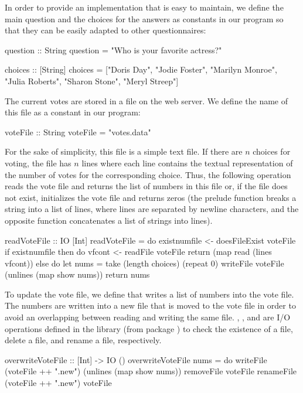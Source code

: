 In order to provide an implementation that is easy to maintain,
we define the main question and the choices for the answers
as constants in our program so that they can be easily adapted
to other questionnaires:
\begin{curry}
question :: String
question = "Who is your favorite actress?"

choices :: [String]
choices = ["Doris Day", "Jodie Foster", "Marilyn Monroe",
           "Julia Roberts", "Sharon Stone", "Meryl Streep"]
\end{curry}
%
The current votes are stored in a file on the web server.
We define the name of this file as a constant in our program:
%
\begin{curry}
voteFile :: String
voteFile = "votes.data"
\end{curry}
%
For the sake of simplicity, this file is a simple text file.
If there are $n$ choices for voting, the file has $n$ lines
where each line contains the textual representation of the
number of votes for the corresponding choice.
Thus, the following operation reads
the vote file and returns the list of numbers in this file
or, if the file does not exist, initializes the vote file
and returns zeros
(the prelude function  breaks
a string into a list of lines, where lines are separated by newline
characters, and the opposite function 
concatenates a list of strings into lines).
%
\begin{curry}
readVoteFile :: IO [Int]
readVoteFile = do
  existnumfile <- doesFileExist voteFile
  if existnumfile
    then do vfcont <- readFile voteFile
            return (map read (lines vfcont))
    else do let nums = take (length choices) (repeat 0)
            writeFile voteFile (unlines (map show nums))
            return nums
\end{curry}
%
To update the vote file, we define 
that writes a list of numbers into the vote file.
The numbers are written into a new file that is moved to the vote file
in order to avoid an overlapping between reading and writing the same file.
,
, and
 are
I/O operations defined in the library 
(from package )
to check the existence of a file, delete a file, and
rename a file, respectively.
%
\begin{curry}
overwriteVoteFile :: [Int] -> IO ()
overwriteVoteFile nums = do
  writeFile (voteFile ++ ".new") (unlines (map show nums))
  removeFile voteFile
  renameFile (voteFile ++ ".new") voteFile
\end{curry}
